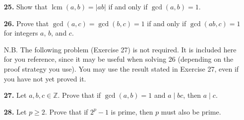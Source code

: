 \documentclass[12pt,reqno]{amsart}
\newcommand{\lcm}{\operatorname{lcm}}
\begin{document}
\begin{enumerate}
\bigskip

\item[{\bf 25.}]
Show that $\lcm(a,b) = |ab|$ if and only if $\gcd(a,b) = 1$.


\bigskip

\item[{\bf 26.}]
Prove that $\gcd(a,c) = \gcd(b,c) =1$ if and only if $\gcd(ab,c) = 1$ for integers $a$, $b$, and $c$.

N.B. The following problem (Exercise 27) is not required. It is included here for you reference, since it may be useful when solving 26 (depending on the proof strategy you use). You may use the result stated in Exercise 27, even if you have not yet proved it.


\bigskip

\item[{\bf 27.}]
Let $a, b, c \in {\mathbb Z}$.  Prove that if $\gcd(a,b) = 1$ and $a  \mid bc$, then $a  \mid  c$. 

 

\bigskip

\item[{\bf 28.}]
Let $p \geq 2$.  Prove that if $2^p-1$ is prime, then $p$ must also be prime.

\end{enumerate}
\end{document}
